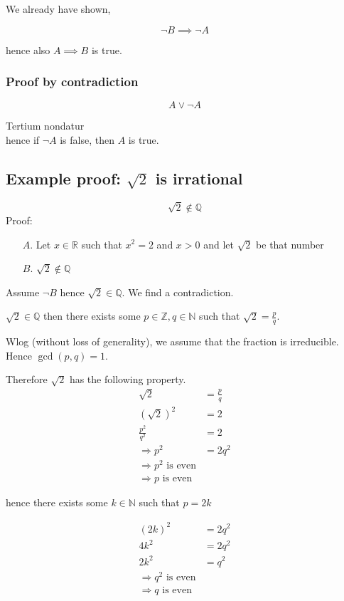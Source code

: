\documentclass[a4paper,landscape,twocolumn]{article}
\begin{document}
We already have shown,

\[ \neg B \implies \neg A \]

hence also $A \implies B$ is true.

\subsubsection{Proof by contradiction}

\[ A \lor \neg A \]

Tertium nondatur \\
hence if $\neg A$ is false, then $A$ is true.

\subsection{Example proof: $\sqrt{2}$ is irrational}
%
\[ \sqrt{2} \not\in \mathbb{Q} \]
%
Proof:
%
\begin{itemize}
  \item[$A$.] Let $x \in \mathbb{R}$ such that $x^2 = 2$ and $x > 0$ and let $\sqrt{2}$ be that number
  \item[$B$.] $\sqrt{2} \not\in \mathbb{Q}$
\end{itemize}

Assume $\neg B$ hence $\sqrt{2} \in \mathbb{Q}$. We find a contradiction.

$\sqrt{2} \in \mathbb{Q}$ then there exists some $p \in \mathbb{Z}, q \in \mathbb{N}$ such that $\sqrt{2} = \frac{p}{q}$.

Wlog (without loss of generality), we assume that the fraction is irreducible. Hence $\operatorname{gcd}(p, q) = 1$.

Therefore $\sqrt{2}$ has the following property.
\begin{align*}
  \sqrt{2} &= \frac{p}{q} \\
  (\sqrt{2})^2 &= 2 \\
  \frac{p^2}{q^2} &= 2 \\
  \Rightarrow p^2 &= 2 q^2 \\
  \Rightarrow p^2 \text{ is even} \\
  \Rightarrow p \text { is even }
\end{align*}

hence there exists some $k \in \mathbb{N}$ such that $p = 2k$

\begin{align*}
  (2k)^2 &= 2q^2 \\
  4k^2 &= 2q^2 \\
  2k^2 &= q^2 \\
  \Rightarrow q^2 \text{ is even} \\
  \Rightarrow q \text{ is even} \\
\end{align*}
\end{document}
